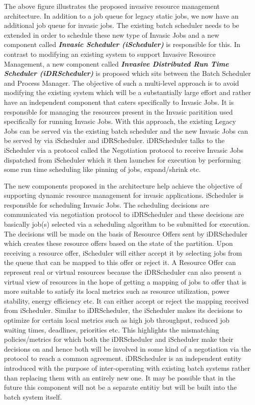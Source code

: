 The above figure illustrates the proposed invasive resource management architecture. In addition to a job queue for legacy static jobs, we now have an additional job queue for invasic jobs. The existing batch scheduler needs to be extended in order to schedule these new type of Invasic Jobs and a new component called \textbf{\textit{Invasic Scheduler (iScheduler)}} is responsible for this. In contrast to modifying an existing system to support Invasive Resource Management, a new component called \textbf{\textit{Invasive Distributed Run Time Scheduler (iDRScheduler)}} is proposed which sits between the Batch Scheduler and Process Manager. The objective of such a multi-level approach is to avoid modifying the existing system which will be a substantially large effort and rather have an independent component that caters specifically to Invasic Jobs. It is responsible for managing the resources present in the Invasic paritition used specifically for running Invasic Jobs. With this approach, the existing Legacy Jobs can be served via the existing batch scheduler and the new Invasic Jobs can be served by via iScheduler and iDRScheduler. iDRScheduler talks to the iScheduler via a protocol called the Negotiation protocol to receive Invasic Jobs dispatched from iScheduler which it then launches for execution by performing some run time scheduling like pinning of jobs, expand/shrink etc.\\ \par
\noindent
The new components proposed in the architecture help achieve the objective of supporting dynamic resource management for invasic applications. iScheduler is responsible for scheduling Invasic Jobs. The scheduling decisions are communicated via negotiation protocol to iDRScheduler and these decisions are basically job(s) selected via a scheduling algorithm to be submitted for execution. The decisions will be made on the basis of Resource Offers sent by iDRScheduler which creates these resource offers based on the state of the partition. Upon receiving a resource offer, iScheduler will either accept it by selecting jobs from the queue that can be mapped to this offer or reject it. A Resource Offer can represent real or virtual resources because the iDRScheduler can also present a virtual view of resources in the hope of getting a mapping of jobs to offer that is more suitable to satisfy its local metrics such as resource utilization, power stability, energy efficiency etc. It can either accept or reject the mapping received from iScheduler. Similar to iDRScheduler, the iScheduler makes its decisions to optimize for certain local metrics such as high job throughput, reduced job waiting times, deadlines, priorities etc. This highlights the mismatching policies/metrics for which both the iDRScheduler and iScheduler make their decisions on and hence both will be involved in some kind of a negotiation via the protocol to reach a common agreement. iDRScheduler is an independent entity introduced with the purpose of inter-operating with existing batch systems rather than replacing them with an entirely new one. It may be possible that in the future this component will not be a separate entitiy but will be built into the batch system itself.\\ \par
